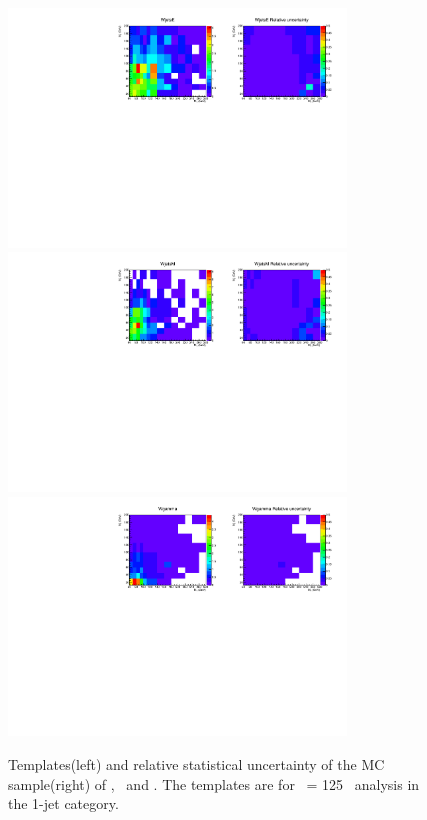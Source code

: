 \begin{figure}[htp]
\centering
\includegraphics[width=0.8\textwidth]{figures/2dtemplate_WjetsE_mH125_1j.pdf}
\includegraphics[width=0.8\textwidth]{figures/2dtemplate_WjetsM_mH125_1j.pdf}
\includegraphics[width=0.8\textwidth]{figures/2dtemplate_Wgamma_mH125_1j.pdf}
\caption{Templates(left) and relative statistical uncertainty of the MC sample(right) 
of \WjetsE, \WjetsM\ and \wgamma. 
The templates are for \mHi\ = 125 \GeV\ analysis in the 1-jet category.}
\label{fig:2dtemplate_125_1j_3}
\end{figure}

